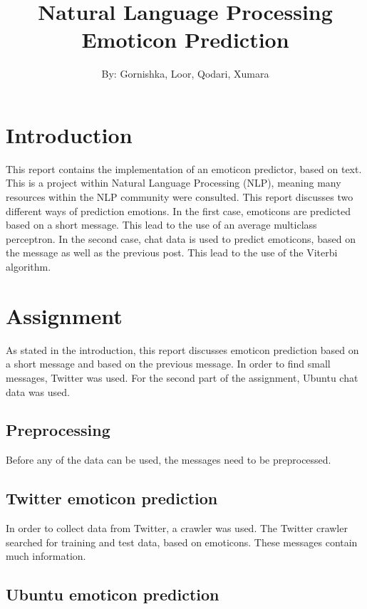 \documentclass{article}
\begin{document}
\title{Natural Language Processing \\ Emoticon Prediction}

\author{By: Gornishka, Loor, Qodari, Xumara}
\maketitle

\pagebreak

\section*{Introduction}
This report contains the implementation of an emoticon predictor, based on text. This is a project within Natural Language Processing (NLP), meaning many resources within the NLP community were consulted. This report discusses two different ways of prediction emotions. In the first case, emoticons are predicted based on a short message. This lead to the use of an average multiclass perceptron. In the second case, chat data is used to predict emoticons, based on the message as well as the previous post. This lead to the use of the Viterbi algorithm.

\section*{Assignment}
As stated in the introduction, this report discusses emoticon prediction based on a short message and based on the previous message. In order to find small messages, Twitter was used. For the second part of the assignment, Ubuntu chat data was used.

\subsection*{Preprocessing}
Before any of the data can be used, the messages need to be preprocessed. 

\subsection*{Twitter emoticon prediction}
In order to collect data from Twitter, a crawler was used. The Twitter crawler searched for training and test data, based on emoticons. These messages contain much information. 

\subsection*{Ubuntu emoticon prediction}
\end{document}
